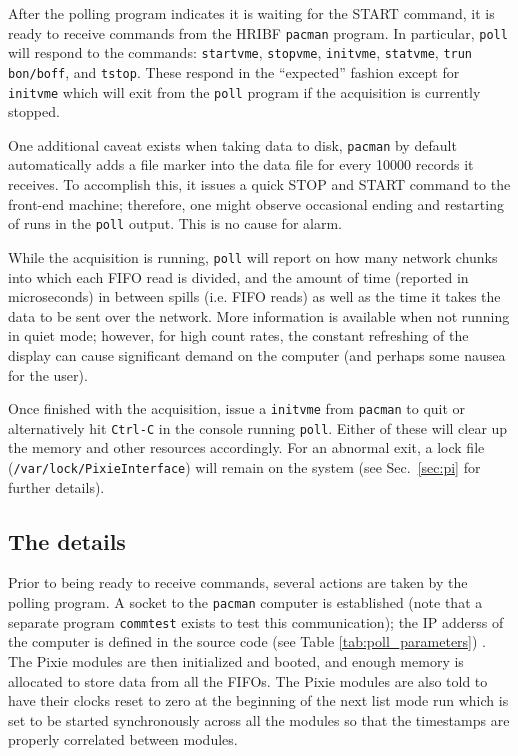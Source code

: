 \documentclass{article}
\begin{document}
After the polling program indicates it is waiting for the \textsc{START} command, it is ready to receive commands from the HRIBF \texttt{pacman} program. In particular, \texttt{poll} will respond to the commands: \texttt{startvme}, \texttt{stopvme}, \texttt{initvme}, \texttt{statvme}, \texttt{trun bon/boff}, and \texttt{tstop}. These respond in the ``expected'' fashion except for \texttt{initvme} which will exit from the \texttt{poll} program if the acquisition is currently stopped.

One additional caveat exists when taking data to disk, \texttt{pacman} by default automatically adds a file marker into the data file for every 10000 records it receives. To accomplish this, it issues a quick \textsc{STOP} and \textsc{START} command to the front-end machine; therefore, one might observe occasional ending and restarting of runs in the \texttt{poll} output. This is no cause for alarm.

While the acquisition is running, \texttt{poll} will report on how many network chunks into which each FIFO read is divided, and the amount of time (reported in microseconds) in between spills (i.e. FIFO reads) as well as the time it takes the data to be sent over the network. More information is available when not running in quiet mode; however, for high count rates, the constant refreshing of the display can cause significant demand on the computer (and perhaps some nausea for the user). 

Once finished with the acquisition, issue a \texttt{initvme} from \texttt{pacman} to quit or alternatively hit \texttt{Ctrl-C} in the console running \texttt{poll}. Either of these will clear up the memory and other resources accordingly. For an abnormal exit, a lock file (\texttt{/var/lock/PixieInterface}) will remain on the system (see Sec.~\ref{sec:pi} for further details).
\subsection{The details}
Prior to being ready to receive commands, several actions are taken by the polling program. A socket to the \texttt{pacman} computer is established (note that a separate program \texttt{commtest} exists to test this communication); the IP adderss of the computer is defined in the source code (see Table \ref{tab:poll_parameters}) . The Pixie modules are then initialized and booted, and enough memory is allocated to store data from all the FIFOs. The Pixie modules are also told to have their clocks reset to zero at the beginning of the next list mode run which is set to be started synchronously across all the modules so that the timestamps are properly correlated between modules.
\end{document}
